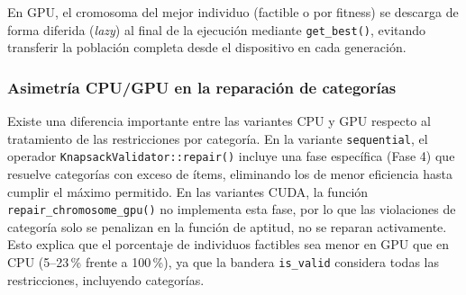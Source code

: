 En GPU, el cromosoma del mejor individuo (factible o por fitness) se descarga de
forma diferida (\emph{lazy}) al final de la ejecución mediante \texttt{get\_best()},
evitando transferir la población completa desde el dispositivo en cada generación.

\subsubsection{Asimetría CPU/GPU en la reparación de categorías}

Existe una diferencia importante entre las variantes CPU y GPU respecto al
tratamiento de las restricciones por categoría. En la variante \texttt{sequential},
el operador \texttt{KnapsackValidator::repair()} incluye una fase específica
(Fase 4) que resuelve categorías con exceso de ítems, eliminando los de menor
eficiencia hasta cumplir el máximo permitido. En las variantes CUDA, la función
\texttt{repair\_chromosome\_gpu()} no implementa esta fase, por lo que las
violaciones de categoría solo se penalizan en la función de aptitud, no se reparan
activamente. Esto explica que el porcentaje de individuos factibles sea menor en
GPU que en CPU (5--23\,\% frente a 100\,\%), ya que la bandera \texttt{is\_valid}
considera todas las restricciones, incluyendo categorías.

